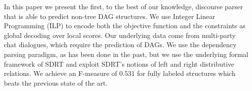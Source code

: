 In this paper we present the first, to the best of our knowledge, discourse parser that is able to predict non-tree DAG structures. We use Integer Linear Programming (ILP) to encode both the objective function and the constraints as global decoding over local scores. Our underlying data come from multi-party chat dialogues, which require the prediction of DAGs. We use the dependency parsing paradigm, as has been done in the past, but we use the underlying formal framework of SDRT and exploit SDRT's notions of left and right distributive relations. We achieve an F-measure of 0.531 for fully labeled structures which beats the previous state of the art.
